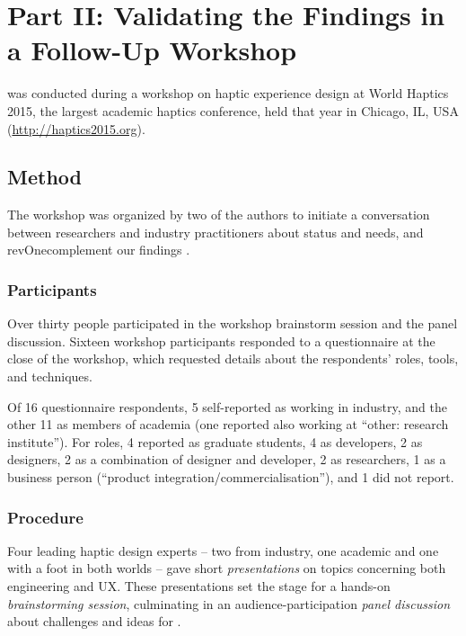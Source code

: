 \section{Part II: Validating the Findings in a Follow-Up Workshop}
\label{sec:workshop}
\noindent
{} was conducted during a workshop on haptic experience design at World Haptics 2015, the largest academic haptics conference, held that year in Chicago, IL, USA %
(\url{http://haptics2015.org}).

\subsection{Method}
\noindent
The workshop was organized by two of the authors %
to initiate a conversation between researchers and industry practitioners about \haxd status and needs, and \\revOne{complement} our findings .

\subsubsection{Participants}
\noindent
Over thirty people participated in the workshop brainstorm session and the panel discussion.
Sixteen workshop participants responded to a questionnaire at the close of the workshop, which requested details about the respondents' roles, tools, and techniques. %

Of 16 questionnaire respondents, 5 self-reported as working in industry, and the other 11 as members of academia (one  reported also working at ``other: research institute'').
For roles, 4 reported as graduate students, 4 as developers, 2 as designers, 2 as a combination of designer and developer, 2 as researchers, 1 as a business person (``product integration/commercialisation''), and 1 did not report.

\subsubsection{Procedure}
\noindent
Four leading haptic design experts -- two from industry, one academic and one with a foot in both worlds -- gave short \emph{presentations} on topics concerning both engineering and UX.
These presentations set the stage for a hands-on \emph{brainstorming session}, culminating in an audience-participation \emph{panel discussion} about challenges and ideas for \haxd. 

